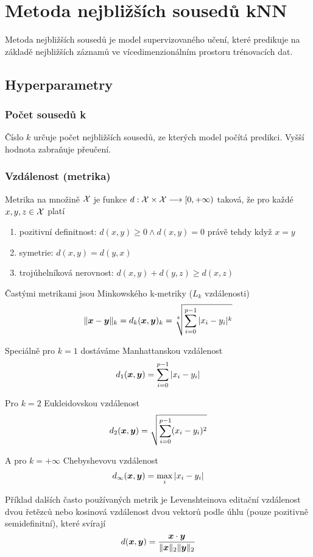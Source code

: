 \section{Metoda nejbližších sousedů kNN}

Metoda nejbližších sousedů je model supervizovaného učení, které predikuje na základě nejbližších záznamů ve vícedimenzionálním prostoru trénovacích dat.

\subsection{Hyperparametry}

\subsubsection{Počet sousedů k}

Číslo $k$ určuje počet nejbližších sousedů, ze kterých model počítá predikci. Vyšší hodnota zabraňuje přeučení.

\subsubsection{Vzdálenost (metrika)} \label{sec:metrika}

Metrika na množině $\mathcal{X}$ je funkce $d: \mathcal{X} \times \mathcal{X} \longrightarrow [0, +\infty)$ taková, že pro každé $x, y, z \in \mathcal{X}$ platí
\begin{enumerate}
    \item pozitivní definitnost: $d(x, y) \ge 0 \land d(x, y) = 0$ právě tehdy když $x = y$
    \item symetrie: $d(x,y) = d(y,x)$
    \item trojúhelníková nerovnost: $d(x, y) + d(y, z) \ge d(x, z)$
\end{enumerate}

Častými metrikami jsou Minkowského k-metriky ($L_k$ vzdálenosti)
\[
    \|\bm{x} - \bm{y}\|_k = d_k(\bm{x}, \bm{y})_k = \sqrt[k]{\sum_{i=0}^{p-1} |x_i - y_i|^k}
\]

Speciálně pro $k=1$ dostáváme Manhattanskou vzdálenost
\[
    d_1(\bm{x}, \bm{y}) = \sum_{i=0}^{p-1} |x_i - y_i|
\]

Pro $k=2$ Eukleidovskou vzdálenost
\[
    d_2(\bm{x}, \bm{y}) = \sqrt{\sum_{i=0}^{p-1} (x_i - y_i)^2}
\]

A pro $k=+\infty$ Chebyshevovu vzdálenost
\[
    d_{\infty}(\bm{x}, \bm{y}) = \max_i |x_i - y_i|
\]

Příklad dalších často používaných metrik je Levenshteinova editační vzdálenost dvou řetězců nebo kosinová vzdálenost dvou vektorů podle úhlu (pouze pozitivně semidefinitní), které svírají
\[
    d(\bm{x}, \bm{y}) = \frac{\bm{x} \cdot \bm{y}}{\|\bm{x}\|_2 \|\bm{y}\|_2}
\]


